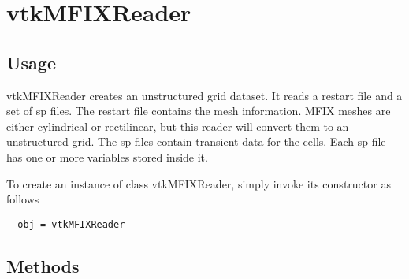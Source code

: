 \section{vtkMFIXReader}

\subsection{Usage}

 vtkMFIXReader creates an unstructured grid dataset. It reads a restart
 file and a set of sp files.  The restart file contains the mesh 
 information.  MFIX meshes are either cylindrical or rectilinear, but 
 this reader will convert them to an unstructured grid.  The sp files 
 contain transient data for the cells.  Each sp file has one or more 
 variables stored inside it.  

To create an instance of class vtkMFIXReader, simply
invoke its constructor as follows
\begin{verbatim}
  obj = vtkMFIXReader
\end{verbatim}
\subsection{Methods}

